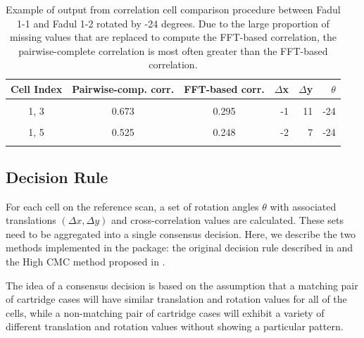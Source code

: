\begin{Schunk}
\begin{table}

\caption{\label{tab:unnamed-chunk-13}\label{tab:cellCCF} Example of output from correlation cell comparison procedure between Fadul 1-1 and Fadul 1-2 rotated by -24 degrees. Due to the large proportion of missing values that are replaced to compute the FFT-based correlation, the pairwise-complete correlation is most often greater than the FFT-based correlation.}
\centering
\begin{tabular}[t]{|cccrrr|}
\toprule
Cell Index & Pairwise-comp. corr. & FFT-based corr. & $\Delta$x & $\Delta$y & $\theta$\\
\midrule
\cellcolor{lightgray}{1, 2} & \cellcolor{lightgray}{0.630} & \cellcolor{lightgray}{0.214} & \cellcolor{lightgray}{31} & \cellcolor{lightgray}{22} & \cellcolor{lightgray}{-24}\\
1, 3 & 0.673 & 0.295 & -1 & 11 & -24\\
\cellcolor{lightgray}{1, 4} & \cellcolor{lightgray}{0.634} & \cellcolor{lightgray}{0.255} & \cellcolor{lightgray}{-2} & \cellcolor{lightgray}{7} & \cellcolor{lightgray}{-24}\\
1, 5 & 0.525 & 0.248 & -2 & 7 & -24\\
\cellcolor{lightgray}{1, 6} & \cellcolor{lightgray}{0.658} & \cellcolor{lightgray}{0.294} & \cellcolor{lightgray}{-1} & \cellcolor{lightgray}{7} & \cellcolor{lightgray}{-24}\\
\bottomrule
\end{tabular}
\end{table}

\end{Schunk}

\hypertarget{decision-rule}{%
\subsection{Decision Rule}\label{decision-rule}}

For each cell on the reference scan, a set of rotation angles \(\theta\)
with associated translations \((\Delta x, \Delta y)\) and
cross-correlation values are calculated. These sets need to be
aggregated into a single consensus decision. Here, we describe the two
methods implemented in the  package: the original decision
rule described in \citet{song_3d_2014} and the High CMC method proposed
in \citep{tong_improved_2015}.

The idea of a consensus decision is based on the assumption that a
matching pair of cartridge cases will have similar translation and
rotation values for all of the cells, while a non-matching pair of
cartridge cases will exhibit a variety of different translation and
rotation values without showing a particular pattern.

